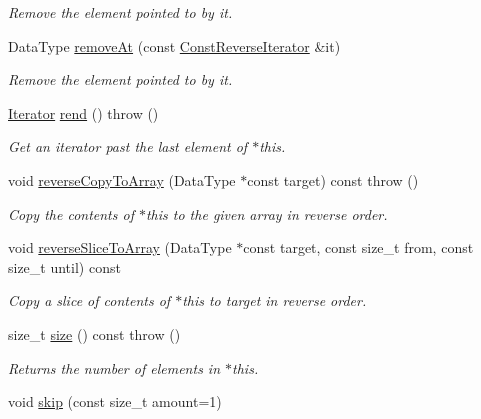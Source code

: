 \begin{DoxyCompactItemize}
\begin{DoxyCompactList}\small\item\em Remove the element pointed to by {\ttfamily it}. \end{DoxyCompactList}\item 
Data\-Type \hyperlink{classVectorDeque_aeb1308e947cb511882ec495fe0dc45ad}{remove\-At} (const \hyperlink{classVectorDeque_a291aa5e53d483276367327acb93f3846}{Const\-Reverse\-Iterator} \&it)
\begin{DoxyCompactList}\small\item\em Remove the element pointed to by {\ttfamily it}. \end{DoxyCompactList}\item 
\hyperlink{classVectorDeque_a14c9e8124611465c5aec6687b9c18a4b}{Iterator} \hyperlink{classVectorDeque_a07d81f4679c64e02d184da597ad5aca6}{rend} ()  throw ()
\begin{DoxyCompactList}\small\item\em Get an iterator past the last element of {\ttfamily $\ast$this}. \end{DoxyCompactList}\item 
void \hyperlink{classVectorDeque_ab006987576c67f39bc5af16cb0b9a5a2}{reverse\-Copy\-To\-Array} (Data\-Type $\ast$const target) const   throw ()
\begin{DoxyCompactList}\small\item\em Copy the contents of {\ttfamily $\ast$this} to the given array in reverse order. \end{DoxyCompactList}\item 
void \hyperlink{classVectorDeque_ab43900b93057928ddaea200bc583a3d5}{reverse\-Slice\-To\-Array} (Data\-Type $\ast$const target, const size\-\_\-t from, const size\-\_\-t until) const 
\begin{DoxyCompactList}\small\item\em Copy a slice of contents of {\ttfamily $\ast$this} to {\ttfamily target} in reverse order. \end{DoxyCompactList}\item 
size\-\_\-t \hyperlink{classVectorDeque_a4828ab569807385baf1fcf952dd0ef13}{size} () const   throw ()
\begin{DoxyCompactList}\small\item\em Returns the number of elements in {\ttfamily $\ast$this}. \end{DoxyCompactList}\item 
void \hyperlink{classVectorDeque_ad4e49c7ef2d032ef574af95129a7f959}{skip} (const size\-\_\-t amount=1)

\end{DoxyCompactItemize}
